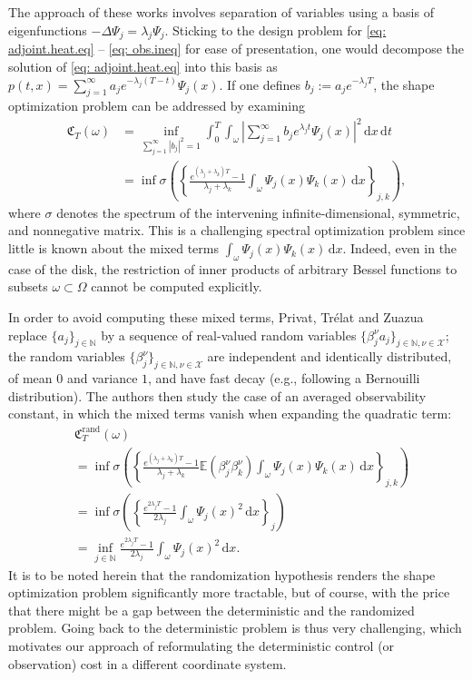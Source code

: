 \documentclass[journal,twoside,web]{ieeecolor}
\newcommand{\diff}{\, \mathrm{d}}
\newcommand{\N}{\mathbb{N}}
\begin{document}
	The approach of these works involves separation of variables using a basis of eigenfunctions $-\Delta \Psi_j = \lambda_j \Psi_j$. Sticking to the design problem for \eqref{eq: adjoint.heat.eq} -- \eqref{eq: obs.ineq} for ease of presentation, one would decompose the solution of \eqref{eq: adjoint.heat.eq} into this basis as $p(t,x) = \sum_{j=1}^\infty a_j e^{-\lambda_j(T-t)}\Psi_j(x)$. If one defines $b_j := a_je^{-\lambda_j T}$, the shape optimization problem can be addressed by examining
	\begin{align*}
	\mathfrak{C}_T(\omega) &= \inf_{\sum_{j=1}^\infty|b_j|^2=1} \int_0^T \int_\omega \left|\sum_{j=1}^\infty b_j e^{\lambda_j t} \Psi_j(x)\right|^2 \diff x \diff t \\
	&= \inf \sigma\left(\left\{\frac{e^{(\lambda_j+\lambda_k)T}-1}{\lambda_j+\lambda_k}\int_\omega\Psi_j(x)\Psi_k(x)\diff x\right\}_{j,k}\right),
	\end{align*}
	where $\sigma$ denotes the spectrum of the intervening infinite-dimensional, symmetric, and nonnegative matrix. This is a challenging spectral optimization problem since little is known about the mixed terms $\int_\omega \Psi_j(x)\Psi_k(x)\diff x$. 
	Indeed, even in the case of the disk, the restriction of inner products of arbitrary Bessel functions to subsets $\omega\subset\Omega$ cannot be computed explicitly. 
	
	In order to avoid computing these mixed terms, Privat, Trélat and Zuazua replace $\{a_j\}_{j\in\N}$ by a sequence of real-valued random variables $\{\beta_j^\nu a_j\}_{j\in\N, \nu \in \mathcal{X}}$; the random variables $\{\beta_j^\nu\}_{j\in\N, \nu\in\mathcal{X}}$ are independent and identically distributed, of mean $0$ and variance $1$, and have fast decay (e.g., following a Bernouilli distribution). The authors then study the case of an averaged observability constant, in which the mixed terms vanish when expanding the quadratic term: 
	\begin{align*}
	&\mathfrak{C}_T^{\mathrm{rand}}(\omega) \\
	&= \inf \sigma\left(\left\{\frac{e^{(\lambda_j+\lambda_k)T}-1}{\lambda_j + \lambda_k} \mathbb{E}(\beta_j^\nu \beta_k^\nu) \int_\omega \Psi_j(x)\Psi_k(x)\diff x\right\}_{j,k}\right)\\
	&= \inf\sigma\left(\left\{\frac{e^{2\lambda_jT}-1}{2\lambda_j} \int_\omega \Psi_j(x)^2\diff x\right\}_j\right)\\
	&= \inf_{j\in\N} \frac{e^{2\lambda_jT}-1}{2\lambda_j} \int_\omega \Psi_j(x)^2\diff x.
	\end{align*}
	It is to be noted herein that the randomization hypothesis renders the shape optimization problem significantly more tractable, but of course, with the price that there might be a gap between the deterministic and the randomized problem. 
	Going back to the deterministic problem is thus very challenging, which motivates our approach of reformulating the deterministic control (or observation) cost in a different coordinate system. 
	\medskip
	
\end{document}
